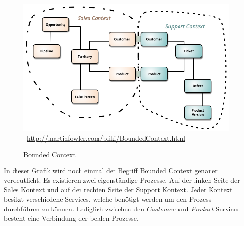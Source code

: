 \begin{figure}[htb]
    \centering 
    \includegraphics[width=\linewidth]{content/images/BoundedContext}\
    \quelle\url{http://martinfowler.com/bliki/BoundedContext.html}
    \caption[Bounded Context]{Bounded Context\\}
    \label{fig:BoundedContext}  
\end{figure} 
In dieser Grafik wird noch einmal der Begriff Bounded Context genauer verdeutlicht. Es existieren zwei eigenständige Prozesse. Auf der linken Seite der Sales Kontext und auf der rechten Seite der Support Kontext. Jeder Kontext besitzt verschiedene Services, welche benötigt werden um den Prozess durchführen zu können. Lediglich zwischen den \textit{Customer} und \textit{Product} Services besteht eine Verbindung der beiden Prozesse.